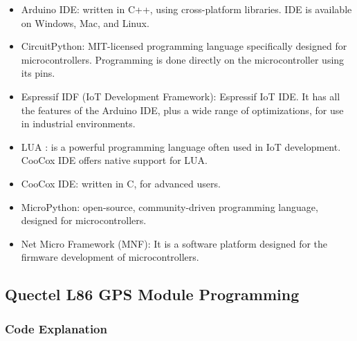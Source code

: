\documentclass{report}
\begin{document}
\begin{itemize}
    \item Arduino IDE: written in C++, using cross-platform libraries. IDE is available on Windows, Mac, and Linux.
    \item CircuitPython: MIT-licensed programming language specifically designed for microcontrollers. Programming is done directly on the microcontroller using its pins.
    \item Espressif IDF (IoT Development Framework): Espressif IoT IDE. It has all the features of the Arduino IDE, plus a wide range of optimizations, for use in industrial environments.
    \item LUA : is a powerful programming language often used in IoT development. CooCox IDE offers  native support for LUA.
    \item CooCox IDE: written in C, for advanced users.
    \item MicroPython: open-source, community-driven programming language, designed for microcontrollers.
    \item Net Micro Framework (MNF): It is a software platform designed for the firmware development of microcontrollers.
\end{itemize}

\subsection{Quectel L86 GPS Module Programming}

\subsubsection{Code Explanation}
\end{document}
